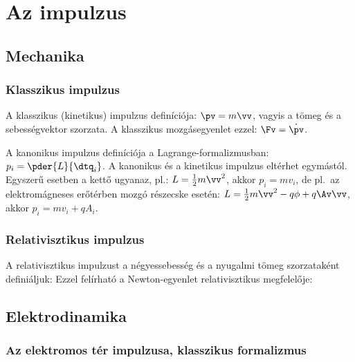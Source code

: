 \chapter{Az impulzus}

 \section{Mechanika}

  \subsection{Klasszikus impulzus}
 
   A klasszikus (kinetikus) impulzus definíciója: $\pv=m\vv$, vagyis a tömeg és a sebességvektor szorzata.
   A klasszikus mozgásegyenlet ezzel: $\Fv=\dot{\pv}$.
   
   A kanonikus impulzus definíciója a Lagrange-formalizmusban: $p_i=\pder{L}{\dtq_i}$.
   A kanonikus és a kinetikus impulzus eltérhet egymástól.
   Egyszerű esetben a kettő ugyanaz, pl.: $L=\frac{1}{2}m\vv^2$, akkor $p_i=mv_i$, de pl.\ az elektromágneses erőtérben mozgó részecske esetén: $L=\frac{1}{2}m\vv^2-q\phi+q\Av\vv$, akkor $p_i=mv_i+qA_i$. 
   
  \subsection{Relativisztikus impulzus}
   
   A relativisztikus impulzust a négyessebesség és a nyugalmi tömeg szorzataként definiáljuk: 
   Ezzel felírható a Newton-egyenlet relativisztikus megfelelője:
   
 \section{Elektrodinamika}
  
  \subsection{Az elektromos tér impulzusa, klasszikus formalizmus}
   
